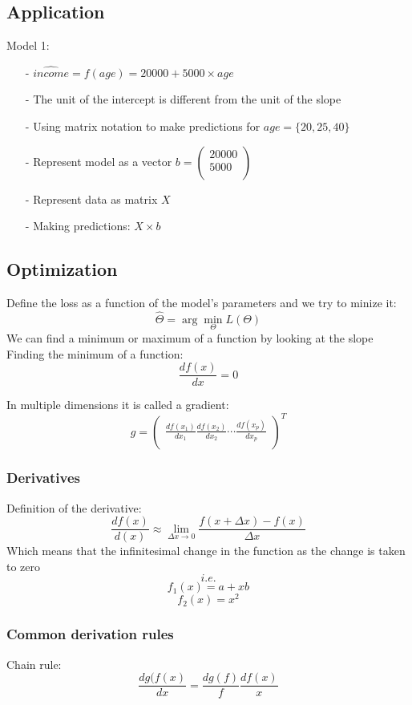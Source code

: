\documentclass[11pt]{article}
\begin{document}
\begin{flushleft}
\subsection{Application}
Model 1: \newline
\begin{itemize}
  \item[-] $\widehat{income}=f(age)= 20000+5000 \times age$
  \item[-] The unit of the intercept is different from the unit of the slope
  \item[-] Using matrix notation to make predictions for $age = \{20, 25, 40\}$
  \item[-] Represent model as a vector $b = \begin{pmatrix} 20000\\ 5000\\ \end{pmatrix}$
  \item[-] Represent data as matrix $X$
  \item[-] Making predictions: $X \times b$
\end{itemize}

\subsection{Optimization}
Define the loss as a function of the model's parameters and we try to minize it:
$$
\widehat{\Theta} = \arg \min_\Theta L(\Theta)
$$\newline
We can find a minimum or maximum of a function by looking at the slope \newline
Finding the minimum of a function:
$$
\frac{df(x)}{dx}=0
$$

In multiple dimensions it is called a gradient:
$$
g = {\begin{pmatrix} \frac{df(x_1)}{dx_1} \frac{df(x_2)}{dx_2} \cdots \frac{df(x_p)}{dx_p}\\ \end{pmatrix}}^T
$$

\subsubsection{Derivatives}
Definition of the derivative:
$$
\frac{df(x)}{d(x)} \approx \lim\limits_{\Delta x \to 0} {\frac {f(x+\Delta x)-f(x)}{\Delta x}}
$$
Which means that the infinitesimal change in the function as the change is taken to zero
$$i.e.$$
  $$f_1(x) = a + xb$$
  $$f_2(x) = x^2$$

\subsubsection*{Common derivation rules}
Chain rule:
$$
{\textstyle \frac{dg(f(x)}{dx}= \frac{dg(f)}{f}\frac{df(x)}{x}}
$$


\end{flushleft}
\end{document}
